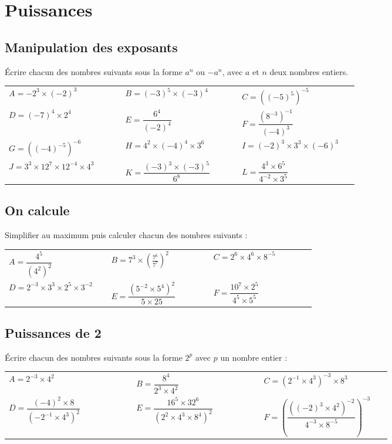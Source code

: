 \documentclass[oneside,12pt]{article}          %
\begin{document}
    

\section{Puissances}

\subsection{Manipulation des exposants}
Écrire chacun des nombres suivants sous la forme $a^n$ ou $-a^n$, avec $a$ et $n$ deux nombres entiers.

\renewcommand{\arraystretch}{2.5}
\begin{tabular}{p{0.3\linewidth} p{0.3\linewidth} p{0.3\linewidth}}
    $A=-2^3\times(-2)^3$ & $B=(-3)^5\times(-3)^4$ & $C=\left((-5)^5\right)^{-5}$ \\
    $D=(-7)^4\times2^4$ & $E=\dfrac{6^4}{(-2)^4}$ & $F=\dfrac{(8^{-3})^{-1}}{(-4)^3}$ \\
    $G=\left((-4)^{-5}\right)^{-6}$ & $H=4^2\times(-4)^4\times3^6$ & $I=(-2)^3\times3^3\times(-6)^3$ \\
    $J=3^3\times12^7\times12^{-4}\times4^3$ & $K=\dfrac{(-3)^3\times(-3)^5}{6^8}$ & $L=\dfrac{4^3\times6^5}{4^{-2}\times3^5}$
\end{tabular}



\subsection{On calcule}
Simplifier au maximum puis calculer chacun des nombres suivants :

\renewcommand{\arraystretch}{2.5}
\begin{tabular}{p{0.3\linewidth} p{0.3\linewidth} p{0.3\linewidth}}
    $A=\dfrac{4^5}{(4^2)^2}$ & $B=7^3\times\left(\frac{7^6}{7^7}\right)^2$ & $C=2^6\times4^6\times8^{-5}$ \\
    $D=2^{-3}\times3^3\times2^5\times3^{-2}$ & $E=\dfrac{\left(5^{-2}\times5^4\right)^2}{5\times25}$ & $F=\dfrac{10^7\times2^5}{4^5\times5^5}$
\end{tabular}



\subsection{Puissances de 2}
Écrire chacun des nombres suivants sous la forme $2^p$ avec $p$ un nombre entier :

\renewcommand{\arraystretch}{2.1}
\begin{tabular}{p{0.3\linewidth} p{0.3\linewidth} p{0.3\linewidth}}
    $A=2^{-3}\times4^2$ & $B= \dfrac{8^4}{2^3\times4^2}$ & $C=\left(2^{-1}\times4^3\right)^{-3}\times8^3$ \\
    $D=\dfrac{(-4)^2\times8}{\left(-2^{-1}\times4^3\right)^2}$ & $E=\dfrac{16^5\times32^6}{\left(2^2\times4^3\times8^4\right)^2}$ & $F=\left(\dfrac{\left((-2)^3\times4^2\right)^{-2}}{4^{-3}\times8^{-5}}\right)^{-3}$
\end{tabular}
\end{document}
